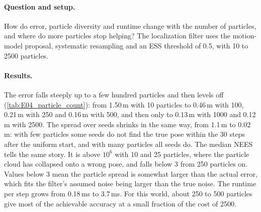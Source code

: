 \paragraph{Question and setup.} How do error, particle diversity and runtime change with the number of particles, and
where do more particles stop helping? The localization filter uses the motion-model proposal, systematic resampling and
an ESS threshold of 0.5, with 10 to 2500 particles.

\paragraph{Results.} The error falls steeply up to a few hundred particles and then levels off
(\cref{tab:E04_particle_count}): from 1.50\,m with 10 particles to 0.46\,m with 100, 0.21\,m with 250 and 0.16\,m with 500,
and then only to 0.13\,m with 1000 and 0.12\,m with 2500. The spread over seeds shrinks in the same way, from 1.1\,m
to 0.02\,m: with few particles some seeds do not find the true pose within the 30 steps after the uniform start, and
with many particles all seeds do. The median NEES tells the same story. It is above $10^6$ with 10 and 25 particles, where the particle cloud
has collapsed onto a wrong pose, and falls below 3 from 250 particles on. Values below 3 mean the particle spread is
somewhat larger than the actual error, which fits the filter's assumed noise being larger than the true noise. The
runtime per step grows from 0.18\,ms to 3.7\,ms. For this world, about 250 to 500 particles give most of the achievable
accuracy at a small fraction of the cost of 2500.

